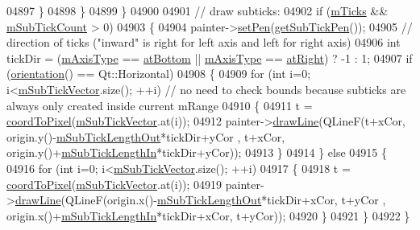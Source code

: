 \begin{DoxyCode}
04897       \}
04898     \}
04899   \}
04900   
04901   \textcolor{comment}{// draw subticks:}
04902   \textcolor{keywordflow}{if} (\hyperlink{a00025_ab111e74bba22e06848897c932fc549fe}{mTicks} && \hyperlink{a00025_ad70198e6ae2801fc409bc3caec707da9}{mSubTickCount} > 0)
04903   \{
04904     painter->\hyperlink{a00047_af9c7a4cd1791403901f8c5b82a150195}{setPen}(\hyperlink{a00025_ab4f7e60a40eb051c775afcaeab895c85}{getSubTickPen}());
04905     \textcolor{comment}{// direction of ticks ("inward" is right for left axis and left for right axis)}
04906     \textcolor{keywordtype}{int} tickDir = (\hyperlink{a00025_ae704bf9f2c2b026f08dd4ccad79c616e}{mAxisType} == \hyperlink{a00025_ae2bcc1728b382f10f064612b368bc18aa220d68888516b6c3b493d144f1ba438f}{atBottom} || \hyperlink{a00025_ae704bf9f2c2b026f08dd4ccad79c616e}{mAxisType} == 
      \hyperlink{a00025_ae2bcc1728b382f10f064612b368bc18aadf5509f7d29199ef2f263b1dd224b345}{atRight}) ? -1 : 1;
04907     \textcolor{keywordflow}{if} (\hyperlink{a00025_a57483f2f60145ddc9e63f3af53959265}{orientation}() == Qt::Horizontal)
04908     \{
04909       \textcolor{keywordflow}{for} (\textcolor{keywordtype}{int} i=0; i<\hyperlink{a00025_a28353081e0ff35c3fe5ced923a287faa}{mSubTickVector}.size(); ++i) \textcolor{comment}{// no need to check bounds because subticks
       are always only created inside current mRange}
04910       \{
04911         t = \hyperlink{a00025_a985ae693b842fb0422b4390fe36d299a}{coordToPixel}(\hyperlink{a00025_a28353081e0ff35c3fe5ced923a287faa}{mSubTickVector}.at(i));
04912         painter->\hyperlink{a00047_a0b4b1b9bd495e182c731774dc800e6e0}{drawLine}(QLineF(t+xCor, origin.y()-\hyperlink{a00025_ae0342609ad543c2667673d75b43d9dbb}{mSubTickLengthOut}*tickDir+yCor
      , t+xCor, origin.y()+\hyperlink{a00025_a6c1400cfa6fb129a6686797fb5ca0307}{mSubTickLengthIn}*tickDir+yCor));
04913       \}
04914     \} \textcolor{keywordflow}{else}
04915     \{
04916       \textcolor{keywordflow}{for} (\textcolor{keywordtype}{int} i=0; i<\hyperlink{a00025_a28353081e0ff35c3fe5ced923a287faa}{mSubTickVector}.size(); ++i)
04917       \{
04918         t = \hyperlink{a00025_a985ae693b842fb0422b4390fe36d299a}{coordToPixel}(\hyperlink{a00025_a28353081e0ff35c3fe5ced923a287faa}{mSubTickVector}.at(i));
04919         painter->\hyperlink{a00047_a0b4b1b9bd495e182c731774dc800e6e0}{drawLine}(QLineF(origin.x()-\hyperlink{a00025_ae0342609ad543c2667673d75b43d9dbb}{mSubTickLengthOut}*tickDir+xCor, t+yCor
      , origin.x()+\hyperlink{a00025_a6c1400cfa6fb129a6686797fb5ca0307}{mSubTickLengthIn}*tickDir+xCor, t+yCor));
04920       \}
04921     \}
04922   \}

\end{DoxyCode}
